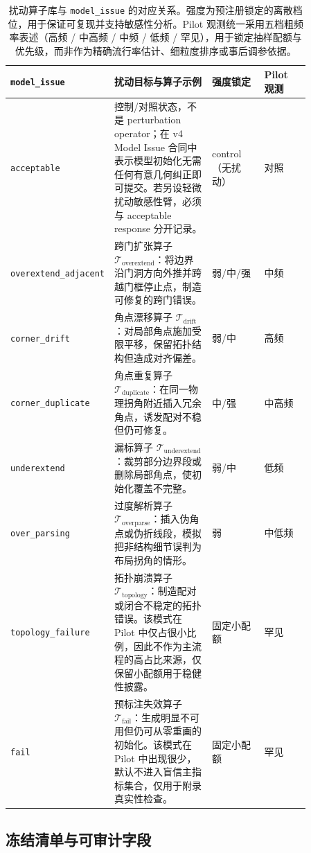 \begin{table}[ht]
\centering
\small
\begin{tabular}{p{0.18\linewidth} p{0.34\linewidth} p{0.18\linewidth} p{0.16\linewidth}}
\toprule
\textbf{\texttt{model\_issue}} & \textbf{扰动目标与算子示例} & \textbf{强度锁定} & \textbf{Pilot 观测}\\
\midrule
\texttt{acceptable} & 控制/对照状态，不是 perturbation operator；在 v4 Model Issue 合同中表示模型初始化无需任何有意几何纠正即可提交。若另设轻微扰动敏感性臂，必须与 acceptable response 分开记录。 & control（无扰动） & 对照\\
\texttt{overextend\_adjacent} & 跨门扩张算子 $\mathcal{T}_{\mathrm{overextend}}$：将边界沿门洞方向外推并跨越门框停止点，制造可修复的跨门错误。 & 弱/中/强 & 中频\\
\texttt{corner\_drift} & 角点漂移算子 $\mathcal{T}_{\mathrm{drift}}$：对局部角点施加受限平移，保留拓扑结构但造成对齐偏差。 & 弱/中 & 高频\\
\texttt{corner\_duplicate} & 角点重复算子 $\mathcal{T}_{\mathrm{duplicate}}$：在同一物理拐角附近插入冗余角点，诱发配对不稳但仍可修复。 & 中/强 & 中高频\\
\texttt{underextend} & 漏标算子 $\mathcal{T}_{\mathrm{underextend}}$：裁剪部分边界段或删除局部角点，使初始化覆盖不完整。 & 弱/中 & 低频\\
\texttt{over\_parsing} & 过度解析算子 $\mathcal{T}_{\mathrm{overparse}}$：插入伪角点或伪折线段，模拟把非结构细节误判为布局拐角的情形。 & 弱 & 中低频\\
\texttt{topology\_failure} & 拓扑崩溃算子 $\mathcal{T}_{\mathrm{topology}}$：制造配对或闭合不稳定的拓扑错误。该模式在 Pilot 中仅占很小比例，因此不作为主流程的高占比来源，仅保留小配额用于稳健性披露。 & 固定小配额 & 罕见\\
\texttt{fail} & 预标注失效算子 $\mathcal{T}_{\mathrm{fail}}$：生成明显不可用但仍可从零重画的初始化。该模式在 Pilot 中出现很少，默认不进入盲信主指标集合，仅用于附录真实性检查。 & 固定小配额 & 罕见\\
\bottomrule
\end{tabular}
\caption{扰动算子库与 \texttt{model\_issue} 的对应关系。强度为预注册锁定的离散档位，用于保证可复现并支持敏感性分析。Pilot 观测统一采用五档粗频率表述（高频 / 中高频 / 中频 / 低频 / 罕见），用于锁定抽样配额与优先级，而非作为精确流行率估计、细粒度排序或事后调参依据。}
\label{tab:perturbation-operator-library}
\end{table}

\subsection{冻结清单与可审计字段}\label{app:perturbation-freeze-list}

